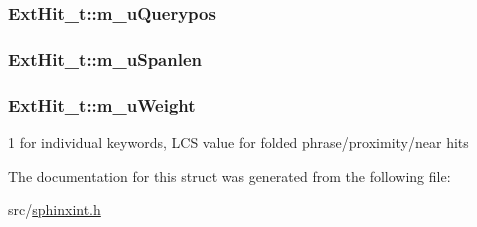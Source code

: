 \hypertarget{structExtHit__t_aed20dada6b9dde4ddb6f19cacd771986}{
\subsubsection[{m\-\_\-u\-Querypos}]{ Ext\-Hit\-\_\-t\-::m\-\_\-u\-Querypos}}\label{structExtHit__t_aed20dada6b9dde4ddb6f19cacd771986}
\hypertarget{structExtHit__t_a5e23d4898a6a0ac97c8047a4425f9bc4}{
\subsubsection[{m\-\_\-u\-Spanlen}]{ Ext\-Hit\-\_\-t\-::m\-\_\-u\-Spanlen}}\label{structExtHit__t_a5e23d4898a6a0ac97c8047a4425f9bc4}
\hypertarget{structExtHit__t_a10adc697543b6239dab714a670a2cf39}{
\subsubsection[{m\-\_\-u\-Weight}]{ Ext\-Hit\-\_\-t\-::m\-\_\-u\-Weight}}\label{structExtHit__t_a10adc697543b6239dab714a670a2cf39}


1 for individual keywords, L\-C\-S value for folded phrase/proximity/near hits 



The documentation for this struct was generated from the following file\-:\begin{DoxyCompactItemize}
\item 
src/\hyperlink{sphinxint_8h}{sphinxint.\-h}\end{DoxyCompactItemize}

